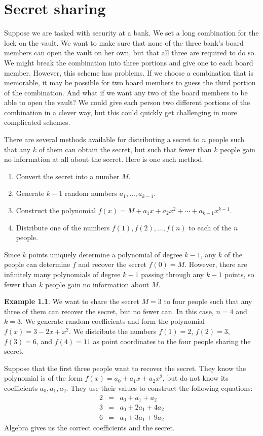 \documentclass{book}
\theoremstyle{plain}
\theoremstyle{definition}
\newtheorem{example}[theorem]{Example}
\begin{document}
\chapter{Secret sharing}
Suppose we are tasked with security at a bank. We set a long combination for the lock on the vault. We want to make sure that none of the three bank's board members can open the vault on her own, but that all three are required to do so. We might break the combination into three portions and give one to each board member. However, this scheme has problems. If we choose a combination that is memorable, it may be possible for two board members to guess the third portion of the combination. And what if we want any two of the board members to be able to open the vault? We could give each person two different portions of the combination in a clever way, but this could quickly get challenging in more complicated schemes.

There are several methods available for distributing a secret to $n$ people such that any $k$ of them can obtain the secret, but such that fewer than $k$ people gain no information at all about the secret. Here is one such method.

\begin{enumerate}
\item Convert the secret into a number $M$.
\item Generate $k-1$ random numbers $a_1,\ldots,a_{k-1}$.
\item Construct the polynomial $f(x) = M + a_1x + a_2x^2 + \cdots + a_{k-1}x^{k-1}$.
\item Distribute one of the numbers $f(1),f(2),\ldots,f(n)$ to each of the $n$ people.
\end{enumerate}

Since $k$ points uniquely determine a polynomial of degree $k-1$, any $k$ of the people can determine $f$ and recover the secret $f(0) = M$. However, there are infinitely many polynomials of degree $k-1$ passing through any $k-1$ points, so fewer than $k$ people gain no information about $M$.

\begin{example}
We want to share the secret $M=3$ to four people such that any three of them can recover the secret, but no fewer can. In this case, $n = 4$ and $k = 3$. We generate random coefficients and form the polynomial $f(x) = 3 - 2x + x^2$. We distribute the numbers $f(1) = 2$, $f(2) = 3$, $f(3) = 6$, and $f(4) = 11$ as point coordinates to the four people sharing the secret.

Suppose that the first three people want to recover the secret. They know the polynomial is of the form $f(x) = a_0 + a_1x + a_2x^2$, but do not know its coefficients $a_0,a_1,a_2$. They use their values to construct the following equations:
\begin{eqnarray*}
2 &=& a_0 + a_1 + a_2 \\
3 &=& a_0 + 2a_1 + 4a_2 \\
6 &=& a_0 + 3a_1 + 9a_2
\end{eqnarray*}
Algebra gives us the correct coefficients and the secret.
\end{example}
\end{document}
